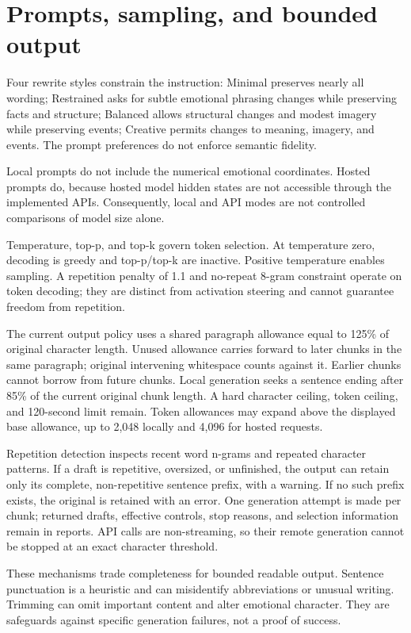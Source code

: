 \documentclass[manuscript,screen,nonacm]{acmart}
\begin{document}
\section{Prompts, sampling, and bounded
output}\label{prompts-sampling-and-bounded-output}

Four rewrite styles constrain the instruction: Minimal preserves nearly
all wording; Restrained asks for subtle emotional phrasing changes while
preserving facts and structure; Balanced allows structural changes and
modest imagery while preserving events; Creative permits changes to
meaning, imagery, and events. The prompt preferences do not enforce
semantic fidelity.

Local prompts do not include the numerical emotional coordinates. Hosted
prompts do, because hosted model hidden states are not accessible
through the implemented APIs. Consequently, local and API modes are not
controlled comparisons of model size alone.

Temperature, top-p, and top-k govern token selection. At temperature
zero, decoding is greedy and top-p/top-k are inactive. Positive
temperature enables sampling. A repetition penalty of 1.1 and no-repeat
8-gram constraint operate on token decoding; they are distinct from
activation steering and cannot guarantee freedom from repetition.

The current output policy uses a shared paragraph allowance equal to
125\% of original character length. Unused allowance carries forward to
later chunks in the same paragraph; original intervening whitespace
counts against it. Earlier chunks cannot borrow from future chunks.
Local generation seeks a sentence ending after 85\% of the current
original chunk length. A hard character ceiling, token ceiling, and
120-second limit remain. Token allowances may expand above the displayed
base allowance, up to 2,048 locally and 4,096 for hosted requests.

Repetition detection inspects recent word n-grams and repeated character
patterns. If a draft is repetitive, oversized, or unfinished, the output
can retain only its complete, non-repetitive sentence prefix, with a
warning. If no such prefix exists, the original is retained with an
error. One generation attempt is made per chunk; returned drafts,
effective controls, stop reasons, and selection information remain in
reports. API calls are non-streaming, so their remote generation cannot
be stopped at an exact character threshold.

These mechanisms trade completeness for bounded readable output.
Sentence punctuation is a heuristic and can misidentify abbreviations or
unusual writing. Trimming can omit important content and alter emotional
character. They are safeguards against specific generation failures, not
a proof of success.
\end{document}
